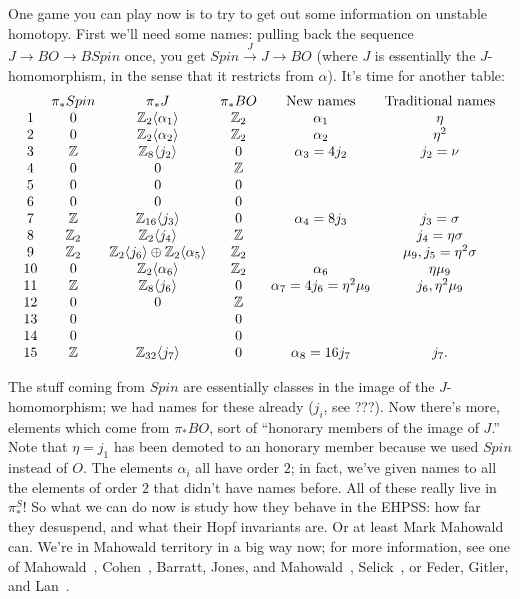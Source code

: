 \documentclass{article}
\newcommand{\Z}{\mathbb{Z}}
\begin{document}
One game you can play now is to try to get out some information on unstable homotopy.  First we'll need some names: pulling back the sequence $J \to BO \to BSpin$ once, you get $Spin \stackrel{J}{\to} J \to BO$ (where $J$ is essentially the $J$-homomorphism, in the sense that it restricts from $\alpha$).  It's time for another table:
\[
\begin{array}{cccccc}
& \pi_* Spin & \pi_* J & \pi_* BO & \hbox{New names} & \hbox{Traditional names} \\
1 & 0 & \Z_2 \langle \alpha_1 \rangle & \Z_2 & \alpha_1 & \eta \\
2 & 0 & \Z_2 \langle \alpha_2 \rangle & \Z_2 & \alpha_2 & \eta^2 \\
3 & \Z & \Z_8 \langle j_2  \rangle & 0 & \alpha_3 = 4 j_2 & j_2 = \nu \\
4 & 0 & 0 & \Z \\
5 & 0 & 0 & 0 \\
6 & 0 & 0 & 0 \\
7 & \Z & \Z_{16} \langle j_3 \rangle & 0 & \alpha_4 = 8j_3 & j_3 = \sigma \\
8 & \Z_2 & \Z_2 \langle j_4 \rangle & \Z & & j_4 = \eta \sigma \\
9 & \Z_2 & \Z_2 \langle j_6 \rangle \oplus \Z_2 \langle \alpha_5 \rangle & \Z_2 & & \mu_9, j_5 = \eta^2 \sigma \\
10 & 0 & \Z_2 \langle \alpha_6 \rangle & \Z_2 & \alpha_6 & \eta \mu_9 \\
11 & \Z & \Z_8 \langle j_6 \rangle & 0 & \alpha_7 = 4 j_6 = \eta^2 \mu_9 & j_6, \eta^2 \mu_9 \\
12 & 0 & 0 & \Z \\
13 & 0 & & 0 \\
14 & 0 & & 0 \\
15 & \Z & \Z_{32} \langle j_7 \rangle & 0 & \alpha_8 = 16j_7 & j_7.
\end{array}
\]

The stuff coming from $Spin$ are essentially classes in the image of the $J$-homomorphism; we had names for these already ($j_i$, see ???).  Now there's more, elements which come from $\pi_* BO$, sort of ``honorary members of the image of $J$.''  Note that $\eta = j_1$ has been demoted to an honorary member because we used $Spin$ instead of $O$.  The elements $\alpha_i$ all have order $2$; in fact, we've given names to all the elements of order $2$ that didn't have names before.  All of these really live in $\pi_*^S$!  So what we can do now is study how they behave in the EHPSS: how far they desuspend, and what their Hopf invariants are.  Or at least Mark Mahowald can.  We're in Mahowald territory in a big way now; for more information, see one of Mahowald~\cite{Mahowald}, Cohen~\cite{CohenKervaire}, Barratt, Jones, and Mahowald~\cite{BJM}, Selick~\cite{Selick}, or Feder, Gitler, and Lan~\cite{FGL}.
\end{document}
